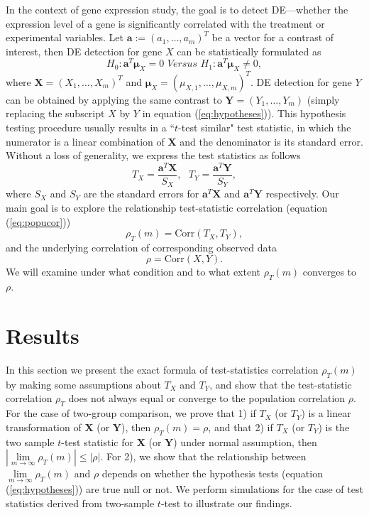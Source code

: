 \documentclass[review]{elsarticle}
\newcommand{\cor}{\text{Corr}}
\begin{document}
	In the context of gene expression study, the goal is to detect DE---whether the expression 
	level of a gene is significantly correlated with the treatment or experimental variables. Let 
	$\bm a:=(a_1, \ldots, a_m)^T$ be a vector for a contrast of interest, then DE detection for 
	gene $X$ can be statistically formulated as 
	\begin{equation}\label{eq:hypotheses}
	H_{0}:  \bm a^T\bm \mu_X = 0 \textit{     Versus   }  H_{1}: \bm a^T\bm \mu_X \neq 0,
	\end{equation}
	where $\bm X = (X_1, \ldots, X_m)^T$ and $\bm \mu_{X} = (\mu_{X, 1}, \ldots, \mu_{X, m})^T$.  
	DE detection for gene $Y$ can be obtained by applying the same contrast to $\bm Y = (Y_1, 
	\ldots, Y_m)$ (simply replacing the subscript $X$ by $Y$ in equation (\ref{eq:hypotheses})).
	This hypothesis testing procedure usually results in a ``$t$-test similar" test statistic, in 
	which the numerator is a linear combination of $\bm X$ and the denominator is its standard 
	error. Without a loss of generality, we express the test statistics as follows
	\begin{equation}\label{eq:teststat}
	T_X = \dfrac{\bm a^T\bm X}{S_X},  ~~~ T_Y = \dfrac{\bm a^T \bm Y}{S_Y},
	\end{equation}  
	where $S_X$ and $S_Y$ are the standard errors for $\bm a^T\bm X$ and $\bm a^T\bm Y$ 
	respectively. Our main goal is to explore the relationship test-statistic correlation (equation 
	(\ref{eq:popucor}))
	\begin{equation}
	\rho_T(m)= \cor({T_X, T_Y}) ,
	\end{equation}  
	and the underlying correlation of corresponding observed data 
	\begin{equation}
	\rho = \cor(X, Y). 
	\end{equation}
	We will examine under what condition and to what extent $\rho_T(m)$ converges to $\rho$.%


	\section{Results}\label{section:tcorresults}
	
	In this section we present the exact formula of test-statistics correlation $\rho_T(m)$ by 
	making some assumptions about $T_X$ and $T_Y$, and show that the test-statistic correlation 
	$\rho_T$ does not always equal or converge to the population correlation $\rho$. For the case of two-group 
	comparison, we prove that 1) if $T_X$ (or $T_Y$) is a linear transformation of $\bm X$ (or $\bm 
	Y$), then $\rho_T(m)= \rho$, and that 2) if $T_X$ (or $T_Y$) is the 
	two sample $t$-test 
	statistic 
	for $\bm X$ (or $\bm Y$) under normal assumption, then 
	$|\lim\limits_{m\rightarrow\infty}\rho_T(m)| 
	\leq |\rho|$. For 2), we show 
	that the relationship between 
	$\lim\limits_{m\rightarrow\infty}\rho_T(m)$ and $\rho$ depends on whether the hypothesis tests 
	(equation (\ref{eq:hypotheses})) are 
	true null or not. We perform simulations for the case of test statistics derived from 
	two-sample $t$-test to illustrate our findings.
	
\end{document}
